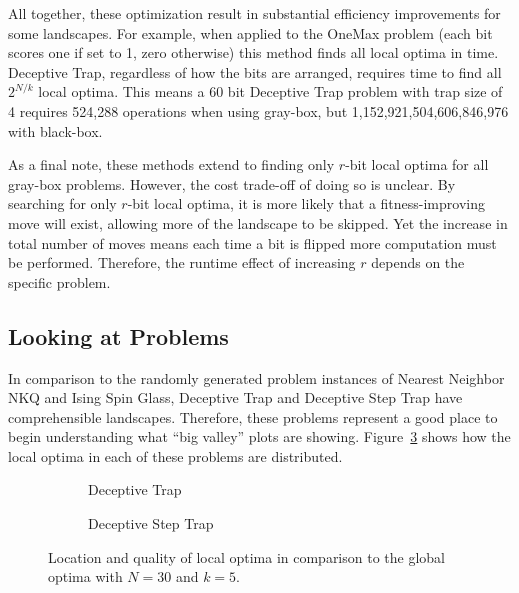 All together, these optimization result in substantial efficiency improvements for some landscapes. For example, when applied to
the OneMax problem (each bit scores one if set to 1, zero otherwise) this method finds all local optima in  time.
Deceptive Trap, regardless of how the bits are arranged, requires  time to find all $2^{N/k}$ local optima.
This means a 60 bit
Deceptive Trap problem with trap size of 4 requires 524,288 operations when using gray-box, but 1,152,921,504,606,846,976
with black-box.

As a final note, these methods extend to finding only $r$-bit local optima for all gray-box problems. However,
the cost trade-off of doing so is unclear. By searching for only $r$-bit local optima, it is more likely
that a fitness-improving move will exist, allowing more of the landscape to be skipped.
Yet the increase in total number of moves
means each time a bit is flipped more computation must be performed. Therefore, the runtime effect of increasing $r$
depends on the specific problem.

\subsection{Looking at Problems}
In comparison to the randomly generated problem instances of Nearest Neighbor NKQ and Ising Spin Glass,
Deceptive Trap and Deceptive Step Trap have comprehensible landscapes. Therefore, these problems represent
a good place to begin understanding what ``big valley'' plots are showing. Figure~\ref{fig-valley-trap} shows
how the local optima in each of these problems are distributed.

\begin{figure}[t]
  \begin{centering}
    \begin{subfigure}{.44\textwidth}
      \begin{centering}
      \end{centering}
      \caption{Deceptive Trap}
      \label{fig-valley-dt}
    \end{subfigure}%
    \begin{subfigure}{.56\textwidth}
      \begin{centering}
      \end{centering}
      \caption{Deceptive Step Trap}
      \label{fig-valley-dst}
    \end{subfigure}
  \end{centering}
  \caption{Location and quality of local optima in comparison to the global optima with $N=30$ and $k=5$.}
  \label{fig-valley-trap}
\end{figure}

